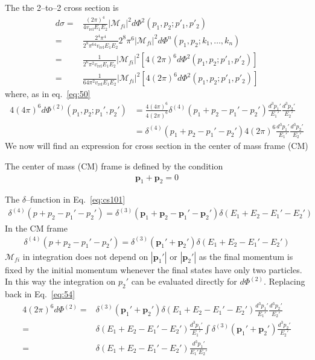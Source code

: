 The the 2--to--2 cross section is
\begin{align}
 \label{eq:54}
  d\sigma=&\frac{(2\pi)^4}{4v_{\text{rel}}E_1E_2}\left|\mathcal{M}_{fi}\right|^2
d\Phi^{2}(p_1,p_2;p'_1,p'_2)\nonumber\\
=&\frac{2^4\pi^4}{2^{8}\pi^64v_{\text{rel}}E_1E_2}2^{8}\pi^6\left|\mathcal{M}_{fi}\right|^2
d\Phi^{n}(p_1,p_2;k_1,\ldots,k_n)\nonumber\\
=&\frac{1}{2^{6}\pi^2v_{\text{rel}}E_1E_2}\left|\mathcal{M}_{fi}\right|^2
\left[4(2\pi)^6d\Phi^{2}(p_1,p_2;p'_1,p'_2)\right]\nonumber\\
=&\frac{1}{64\pi^2v_{\text{rel}}E_1E_2}\left|\mathcal{M}_{fi}\right|^2
\left[4(2\pi)^6d\Phi^{2}(p_1,p_2;p'_1,p'_2)\right]
\end{align}
where, as in eq.~\eqref{eq:50}
\begin{align}
  \label{eq:cs101}
4(4\pi)^6d\Phi^{(2)}(p_1,p_2;p_1',p_2')&= \frac{4(4\pi)^6}{4(2\pi)^6} \delta^{(4)}\left(p_1+p_2-p_1'-p_2'\right)
\frac{d^3p_1'}{E_{1}'}\frac{d^3p_2'}{E_{2}'}\nonumber\\
&=  \delta^{(4)}\left(p_1+p_2-p_1'-p_2'\right)4(2\pi)^6
\frac{d^3p_1'}{E_{1}'}\frac{d^3p_2'}{E_{2}'}
\end{align}
We now will find an expression for cross section in the center of mass frame (CM) 


The center of mass (CM) frame is defined by the condition
\begin{align}
  \label{eq:cm}
  \mathbf{p}_1+\mathbf{p}_2=0
\end{align}


The $\delta$--function in Eq.~\eqref{eq:cs101}
\begin{align}
\label{eq:56}
  \delta^{(4)}(p+p_2-p_1'-p_2')=\delta^{(3)}(\mathbf{p}_1+\mathbf{p}_2-\mathbf{p}_1'-\mathbf{p}_2')
\delta(E_1+E_2-E_1'-E_2')
\end{align}
In the CM frame
\begin{align}
\label{eq:148}
  \delta^{(4)}(p+p_2-p_1'-p_2')=\delta^{(3)}(\mathbf{p}_1'+\mathbf{p}_2')
\delta(E_1+E_2-E_1'-E_2')
\end{align}
$\mathcal{M}_{fi}$ in integration does not depend on $|\mathbf{p}_1'|$ or $|\mathbf{p}_2'|$ as the final momentum is fixed by the initial momentum whenever the final states have only two particles. In this way the integration on $p_2'$ can be evaluated directly for $d\Phi^{(2)}$. Replacing back in Eq.~\eqref{eq:54}
\begin{align}
\label{eq:149}
  4(2\pi)^6d\Phi^{(2)}=&\delta^{(3)}(\mathbf{p}_1'+\mathbf{p}_2')\delta(E_1+E_2-E_1'-E_2')
\frac{d^3p_1'}{E_{1}'}\frac{d^3p_2'}{E_{2}'}\nonumber\\
 =&\delta(E_1+E_2-E_1'-E_2')
\frac{d^3p_1'}{E_{1}'}\int\delta^{(3)}(\mathbf{p}_1'+\mathbf{p}_2')\frac{d^3p_2'}{E_{2}'}\nonumber\\
=&\delta(E_1+E_2-E_1'-E_2')
\frac{d^3p_1'}{E_{1}'E_{2}'}
\end{align}


